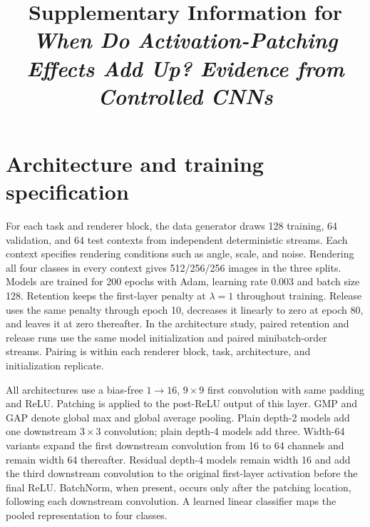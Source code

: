 \documentclass[pdflatex,sn-basic]{sn-jnl}
\begin{document}
\title[Supplementary Information]{Supplementary Information for \emph{When Do Activation-Patching Effects Add Up? Evidence from Controlled CNNs}}

\author*[1]{ }

\maketitle

\renewcommand{\thesection}{S\arabic{section}}
\renewcommand{\thesubsection}{\thesection.\arabic{subsection}}
\renewcommand{\thetable}{S\arabic{table}}
\renewcommand{\thefigure}{S\arabic{figure}}
\renewcommand{\theequation}{S\arabic{equation}}

\section{Architecture and training specification}\label{supp:architecture-training}

For each task and renderer block, the data generator draws 128 training, 64 validation, and 64 test contexts from independent deterministic streams. Each context specifies rendering conditions such as angle, scale, and noise. Rendering all four classes in every context gives 512/256/256 images in the three splits. Models are trained for 200 epochs with Adam, learning rate 0.003 and batch size 128. Retention keeps the first-layer penalty at $\lambda=1$ throughout training. Release uses the same penalty through epoch 10, decreases it linearly to zero at epoch 80, and leaves it at zero thereafter. In the architecture study, paired retention and release runs use the same model initialization and paired minibatch-order streams. Pairing is within each renderer block, task, architecture, and initialization replicate.

All architectures use a bias-free $1\!\to\!16$, $9\times9$ first convolution with same padding and ReLU. Patching is applied to the post-ReLU output of this layer. GMP and GAP denote global max and global average pooling. Plain depth-2 models add one downstream $3\times3$ convolution; plain depth-4 models add three. Width-64 variants expand the first downstream convolution from 16 to 64 channels and remain width 64 thereafter. Residual depth-4 models remain width 16 and add the third downstream convolution to the original first-layer activation before the final ReLU. BatchNorm, when present, occurs only after the patching location, following each downstream convolution. A learned linear classifier maps the pooled representation to four classes.
\end{document}
